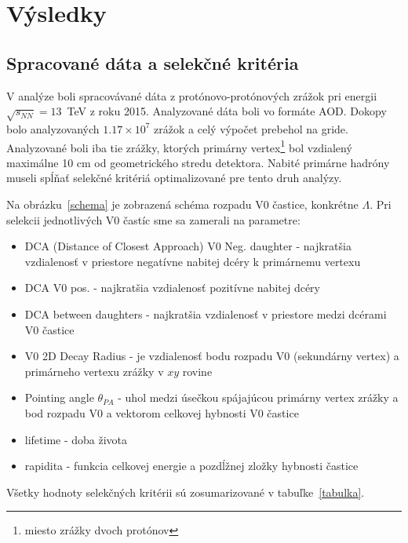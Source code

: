 \documentclass[thesismargins, thesislinespacing]{rnthesis}
\begin{document}
\chapter{Výsledky}

\section{Spracované dáta a selekčné kritéria}
V analýze boli spracovávané dáta z protónovo-protónových zrážok pri energii $\sqrt{s_{NN}}=13$~TeV z roku 2015. Analyzované dáta boli vo formáte AOD. Dokopy bolo analyzovaných $1.17\times10^7$ zrážok a celý výpočet prebehol na gride. Analyzované boli iba tie zrážky, ktorých primárny vertex\footnote{miesto zrážky dvoch protónov} bol vzdialený maximálne 10 cm od geometrického stredu detektora. Nabité primárne hadróny museli spĺňať selekčné kritériá optimalizované pre tento druh analýzy.

Na obrázku~\ref{schema} je zobrazená schéma rozpadu V0 častice, konkrétne $\Lambda$. Pri selekcii jednotlivých V0 častíc sme sa zamerali na parametre:
\begin{itemize}
	\item DCA (Distance of Closest Approach) V0 Neg. daughter - najkratšia vzdialenosť v priestore negatívne nabitej dcéry k primárnemu vertexu
	\item DCA V0 pos. - najkratšia vzdialenosť pozitívne nabitej dcéry
	\item DCA between daughters - najkratšia vzdialenosť v priestore medzi dcérami V0 častice
	\item V0 2D Decay Radius  - je vzdialenosť bodu rozpadu V0 (sekundárny vertex) a primárneho vertexu zrážky v $xy$ rovine
	\item Pointing angle $\theta_{PA}$ - uhol medzi úsečkou spájajúcou primárny vertex zrážky a bod rozpadu V0 a vektorom celkovej hybnosti V0 častice
	\item lifetime - doba života
	\item rapidita - funkcia celkovej energie a pozdĺžnej zložky hybnosti častice
\end{itemize} 
Všetky hodnoty selekčných kritérii sú zosumarizované v tabuľke~\ref{tabulka}.
\end{document}

